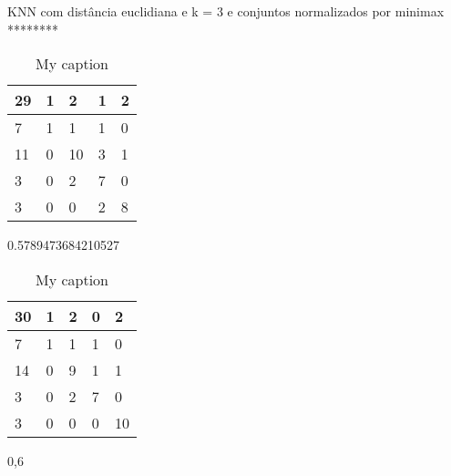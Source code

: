 \documentclass[12pt]{article}
\begin{document}
KNN com distância euclidiana e k = 3 e conjuntos normalizados por minimax
********





\begin{table}[]
\centering
\caption{My caption}
\label{my-label}
\begin{tabular}{|l|l|l|l|l|}
\hline
29 & 1 & 2  & 1 & 2 \\ \hline
7  & 1 & 1  & 1 & 0 \\ \hline
11 & 0 & 10 & 3 & 1 \\ \hline
3  & 0 & 2  & 7 & 0 \\ \hline
3  & 0 & 0  & 2 & 8 \\ \hline
\end{tabular}
\end{table}
0.5789473684210527




\begin{table}[]
\centering
\caption{My caption}
\label{my-label}
\begin{tabular}{|l|l|l|l|l|}
\hline
30 & 1 & 2 & 0 & 2  \\ \hline
7  & 1 & 1 & 1 & 0  \\ \hline
14 & 0 & 9 & 1 & 1  \\ \hline
3  & 0 & 2 & 7 & 0  \\ \hline
3  & 0 & 0 & 0 & 10 \\ \hline
\end{tabular}
\end{table}
0,6
\end{document}
